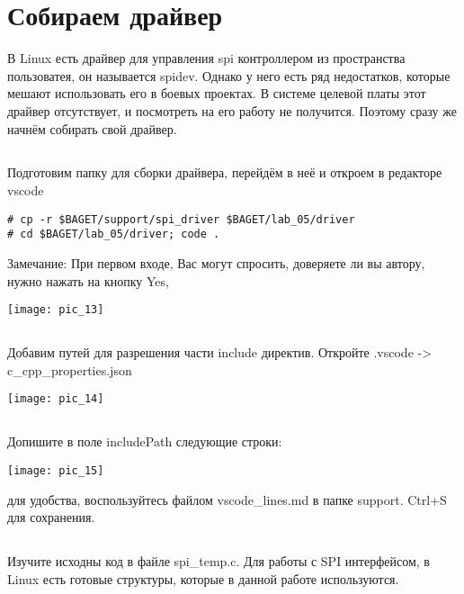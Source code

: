 \section{Собираем драйвер}
В Linux есть драйвер для управления spi контроллером из пространства пользоватея, он называется spidev. Однако у него есть ряд недостатков, которые мешают использовать его в боевых проектах. В системе целевой платы этот драйвер отсутствует, и посмотреть на его работу не получится. Поэтому сразу же начнём собирать свой драйвер.

\subsection{}Подготовим папку для сборки драйвера, перейдём в неё и откроем в редакторе vscode
\begin{lstlisting}[style=bash]
# cp -r $BAGET/support/spi_driver $BAGET/lab_05/driver 
# cd $BAGET/lab_05/driver; code .
\end{lstlisting}
\begin{Notes}{Замечание:}
	При первом входе, Вас могут спросить, доверяете ли вы автору, нужно нажать на кнопку Yes, 
	\begin{center}
		\texttt{[image: pic\_13]}
	\end{center}
\end{Notes}

\subsection{}Добавим путей для разрешения части include директив. Откройте .vscode -> c\_cpp\_properties.json
\begin{center}
	\texttt{[image: pic\_14]}
\end{center}

\subsection{}Допишите в поле includePath следующие строки:\\
\begin{center}
	\texttt{[image: pic\_15]}
\end{center}
для удобства, воспользуйтесь файлом vscode\_lines.md в папке support. Ctrl+S для сохранения.

\subsection{}Изучите исходны код в файле spi\_temp.c. Для работы с SPI интерфейсом, в Linux есть готовые структуры, которые в данной работе используются. 

